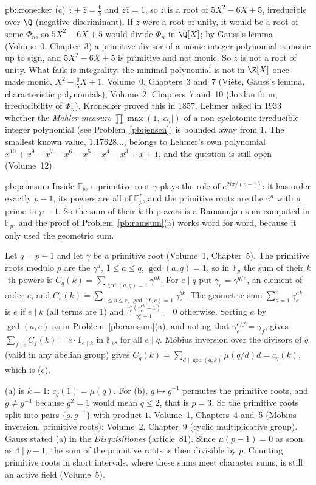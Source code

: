 \begin{solution}{pb:kronecker}
(c) $z+\bar z=\frac65$ and $z\bar z=1$, so $z$ is a root of $5X^2-6X+5$, irreducible over $\Q$ (negative discriminant).
If $z$ were a root of unity, it would be a root of some $\Phi_n$, so $5X^2-6X+5$ would divide $\Phi_n$ in $\Q[X]$; by Gauss's
lemma (Volume~0, Chapter~3) a primitive divisor of a monic integer polynomial is monic up to sign, and $5X^2-6X+5$ is
primitive and not monic. So $z$ is not a root of unity. What fails is integrality: the minimal polynomial is not in
$\Z[X]$ once made monic, $X^2-\frac65X+1$.
\tools Volume~0, Chapters~3 and~7 (Viète, Gauss's lemma, characteristic polynomials); Volume~2, Chapters~7 and~10 (Jordan form,
irreducibility of $\Phi_n$).
\leads Kronecker proved this in 1857. Lehmer asked in 1933 whether the \emph{Mahler measure} $\prod\max(1,|\alpha_i|)$ of a
non-cyclotomic irreducible integer polynomial (see Problem~\ref{pb:jensen}) is bounded away from $1$. The smallest known value,
$1.17628\ldots$, belongs to Lehmer's own polynomial $x^{10}+x^9-x^7-x^6-x^5-x^4-x^3+x+1$, and the question is still open
(Volume~12).
\end{solution}

\begin{solution}{pb:primsum}
\idea Inside $\mathbb F_p$, a primitive root $\gamma$ plays the role of $e^{2i\pi/(p-1)}$: it has order exactly $p-1$, its
powers are all of $\mathbb F_p^*$, and the primitive roots are the $\gamma^a$ with $a$ prime to $p-1$. So the sum of their
$k$-th powers is a Ramanujan sum computed in $\mathbb F_p$, and the proof of Problem~\ref{pb:ramsum}(a) works word for word,
because it only used the geometric sum.

\writeup Let $q=p-1$ and let $\gamma$ be a primitive root (Volume~1, Chapter~5). The primitive roots modulo $p$ are the
$\gamma^a$, $1\le a\le q$, $\gcd(a,q)=1$, so in $\mathbb F_p$ the sum of their $k$-th powers is
$C_q(k)=\sum_{\gcd(a,q)=1}\gamma^{ak}$. For $e\mid q$ put $\gamma_e=\gamma^{q/e}$, an element of order $e$, and
$C_e(k)=\sum_{1\le b\le e,\ \gcd(b,e)=1}\gamma_e^{bk}$. The geometric sum $\sum_{a=1}^e\gamma_e^{ak}$ is $e$ if $e\mid k$ (all
terms are $1$) and $\frac{\gamma_e^{k}(\gamma_e^{ek}-1)}{\gamma_e^k-1}=0$ otherwise. Sorting $a$ by $\gcd(a,e)$ as in
Problem~\ref{pb:ramsum}(a), and noting that $\gamma_e^{e/f}=\gamma_f$, gives $\sum_{f\mid e}C_f(k)=e\cdot\mathbf 1_{e\mid k}$ in
$\mathbb F_p$, for all $e\mid q$. Möbius inversion over the divisors of $q$ (valid in any abelian group) gives
$C_q(k)=\sum_{d\mid\gcd(q,k)}\mu(q/d)d=c_q(k)$, which is (c).

(a) is $k=1$: $c_q(1)=\mu(q)$. For (b), $g\mapsto g^{-1}$ permutes the primitive roots, and $g\ne g^{-1}$ because $g^2=1$
would mean $q\le2$, that is $p=3$. So the primitive roots split into pairs $\{g,g^{-1}\}$ with product $1$.
\tools Volume~1, Chapters~4 and~5 (Möbius inversion, primitive roots); Volume~2, Chapter~9 (cyclic multiplicative group).
\leads Gauss stated (a) in the \emph{Disquisitiones} (article~81). Since $\mu(p-1)=0$ as soon as $4\mid p-1$, the sum of the
primitive roots is then divisible by $p$. Counting primitive roots in short intervals, where these sums meet character sums,
is still an active field (Volume~5).
\end{solution}

